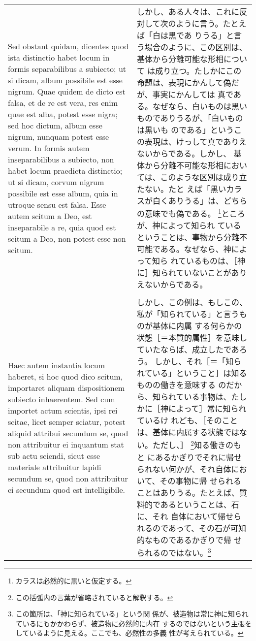 \documentclass[10pt]{jsarticle} %
\begin{document}
\begin{longtable}{p{21em}p{21em}}
Sed obstant quidam, dicentes quod ista distinctio habet locum in
formis separabilibus a subiecto; ut si dicam, album possibile est esse
nigrum. Quae quidem de dicto est falsa, et de re est vera, res enim
quae est alba, potest esse nigra; sed hoc dictum, album esse nigrum,
nunquam potest esse verum. In formis autem inseparabilibus a subiecto,
non habet locum praedicta distinctio; ut si dicam, corvum nigrum
possibile est esse album, quia in utroque sensu est falsa. Esse autem
scitum a Deo, est inseparabile a re, quia quod est scitum a Deo, non
potest esse non scitum.


&

しかし、ある人々は、これに反対して次のように言う。たとえば「白は黒であ
りうる」と言う場合のように、この区別は、基体から分離可能な形相について
は成り立つ。たしかにこの命題は、表現にかんして偽だが、事実にかんしては
真である。なぜなら、白いものは黒いものでありうるが、「白いものは黒いも
のである」というこの表現は、けっして真でありえないからである。しかし、
基体から分離不可能な形相においては、このような区別は成り立たない。たと
えば「黒いカラスが白くありうる」は、どちらの意味でも偽である。
\footnote{カラスは必然的に黒いと仮定する。}ところが、神によって知られ
ているということは、事物から分離不可能である。なぜなら、神によって知ら
れているものは、［神に］知られていないことがありえないからである。



\\\\


Haec autem instantia locum haberet, si hoc quod dico scitum,
importaret aliquam dispositionem subiecto inhaerentem. Sed cum
importet actum scientis, ipsi rei scitae, licet semper sciatur, potest
aliquid attribui secundum se, quod non attribuitur ei inquantum stat
sub actu sciendi, sicut esse materiale attribuitur lapidi secundum se,
quod non attribuitur ei secundum quod est intelligibile.


&

しかし、この例は、もしこの、私が「知られている」と言うものが基体に内属
する何らかの状態［＝本質的属性］を意味していたならば、成立したであろう。
しかし、それ［＝「知られている」ということ］は知るものの働きを意味する
のだから、知られている事物は、たしかに［神によって］常に知られているけ
れども、［そのことは、基体に内属する状態ではない。ただし、］
\footnote{この括弧内の言葉が省略されていると解釈する。}知る働きのもと
にあるかぎりでそれに帰せられない何かが、それ自体において、その事物に帰
せられることはありうる。たとえば、質料的であるということは、石に、それ
自体において帰せられるのであって、その石が可知的なものであるかぎりで帰
せられるのではない。\footnote{この箇所は、「神に知られている」という関
係が、被造物は常に神に知られているにもかかわらず、被造物に必然的に内在
するのではないという主張をしているように見える。ここでも、必然性の多義
性が考えられている。}

\end{longtable}
\newpage
\end{document}
